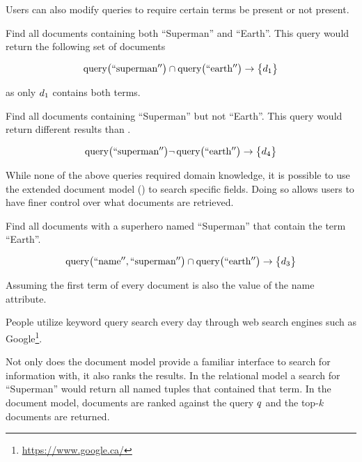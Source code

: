 		Users can also modify queries to require certain terms be present or not present.
		
		\begin{ex}
		\label{ex:and-query}
			Find all documents containing both ``Superman'' and ``Earth''.  This query would return the following set of documents
			
			\[
			    \operatorname{query}\bigl(\mathrm{``superman''}\bigr) \cap \operatorname{query}\bigl(\mathrm{``earth''}\bigr) \rightarrow \bigl\{d_1\bigr\}
		    \]
			
			as only $d_1$ contains both terms.
		\end{ex}
		
		\begin{ex}
			Find all documents containing ``Superman'' but not ``Earth''.  This query would return different results than .
			
			\[
			    \operatorname{query}\bigl(\mathrm{``superman''}\bigr) \neg\operatorname{query}\bigl(\mathrm{``earth''}\bigr) \rightarrow \bigl\{d_4\bigr\}
			\]
		\end{ex}
		
		While none of the above queries required domain knowledge, it is possible to use the extended document model () to search specific fields.  Doing so allows users to have finer control over what documents are retrieved.
		
		\begin{ex}
			Find all documents with a superhero named ``Superman'' that contain the term ``Earth''.
			
			\[
				\operatorname{query}\bigl(\mathrm{``name''}, \mathrm{``superman''}\bigr) \cap \operatorname{query}\bigl(\mathrm{``earth''}\bigr) \rightarrow \bigl\{d_3\bigr\}
			\]
			
			Assuming the first term of every document is also the value of the name attribute.
		\end{ex}
		
		People utilize keyword query search every day through web search engines such as Google\footnote{\url{https://www.google.ca/}}.
		
		Not only does the document model provide a familiar interface to search for information with, it also ranks the results.  In the relational model a search for ``Superman'' would return all named tuples that contained that term.  In the document model, documents are ranked against the query $q$ and the top-$k$ documents are returned.
		
